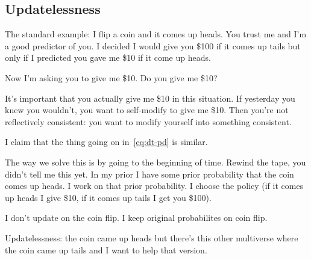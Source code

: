 \documentclass[11pt]{article}
\begin{document}









\subsection{Updatelessness}

The standard example: I flip a coin and it comes up heads. You trust me and I'm a good predictor of you. I decided I would give you \$100 if it comes up tails but only if I predicted you gave me \$10 if it come up heads.

Now I'm asking you to give me \$10. Do you give me \$10?


It's important that you actually give me \$10 in this situation. If yesterday you knew you wouldn't, you want to self-modify to give me \$10. Then you're not reflectively consistent: you want to modify yourself into something consistent.

I claim that the thing going on in~\eqref{eq:dt-pd} is similar.

The way we solve this is by going to the beginning of time. Rewind the tape, you didn't tell me this yet. In my prior I have some prior probability that the coin comes up heads. I work on that prior probability. I choose the policy (if it comes up heads I give \$10, if it comes up tails I get you \$100). 

I don't update on the coin flip. I keep original probabilites on coin flip. %

Updatelessness: the coin came up heads but there's this other multiverse where the coin came up tails and I want to help that version.
\end{document}
